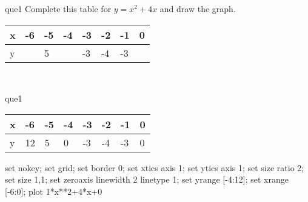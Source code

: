 \documentclass[13.5pt, varwidth=true]{beamer}
\begin{document}
\begin{frame}[shrink=19,fragile]
	\begin{beamercolorbox}[rounded=true, left, shadow=true,wd=14.8cm]{que1}
		 Complete this table for $y = x^{2} + 4x$ and draw the graph. \\[0.3cm] \renewcommand{\arraystretch}{1.2}\begin{tabular}{|C|C|C|C|C|C|C|C|} \hline x & -6 & -5 & -4 & -3 & -2 & -1 & 0 \\ \hline y &  & 5 &  & -3 & -4 & -3 & \\ \hline \end{tabular}\\[0.3cm]
	\end{beamercolorbox}
\end{frame}
\begin{frame}[shrink=19,fragile]
	\begin{beamercolorbox}[rounded=true, left, shadow=true,wd=14.8cm]{que1}
		\renewcommand{\arraystretch}{1.2}\begin{tabular}{|C|C|C|C|C|C|C|C|} \hline x & -6 & -5 & -4 & -3 & -2 & -1 & 0 \\ \hline y & 12 & 5 & 0 & -3 & -4 & -3 & 0\\ \hline \end{tabular}\begin{gnuplot}[terminal=pdf] set nokey; set grid; set border 0; set xtics axis 1; set ytics axis 1; set size ratio 2; set size 1,1; set zeroaxis linewidth 2 linetype 1; set yrange [-4:12]; set xrange [-6:0]; plot 1*x**2+4*x+0 \end{gnuplot}
	\end{beamercolorbox}
\end{frame}
\end{document}
